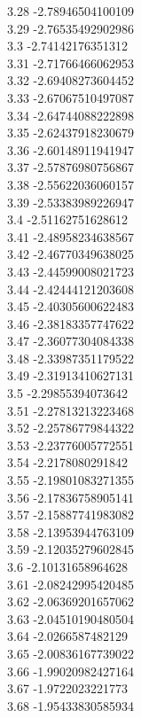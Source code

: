 {3.28	-2.78946504100109\\
3.29	-2.76535492902986\\
3.3	-2.74142176351312\\
3.31	-2.71766466062953\\
3.32	-2.69408273604452\\
3.33	-2.67067510497087\\
3.34	-2.64744088222898\\
3.35	-2.62437918230679\\
3.36	-2.60148911941947\\
3.37	-2.57876980756867\\
3.38	-2.55622036060157\\
3.39	-2.53383989226947\\
3.4	-2.51162751628612\\
3.41	-2.48958234638567\\
3.42	-2.46770349638025\\
3.43	-2.44599008021723\\
3.44	-2.42444121203608\\
3.45	-2.40305600622483\\
3.46	-2.38183357747622\\
3.47	-2.36077304084338\\
3.48	-2.33987351179522\\
3.49	-2.31913410627131\\
3.5	-2.29855394073642\\
3.51	-2.27813213223468\\
3.52	-2.25786779844322\\
3.53	-2.23776005772551\\
3.54	-2.2178080291842\\
3.55	-2.19801083271355\\
3.56	-2.17836758905141\\
3.57	-2.15887741983082\\
3.58	-2.13953944763109\\
3.59	-2.12035279602845\\
3.6	-2.10131658964628\\
3.61	-2.08242995420485\\
3.62	-2.06369201657062\\
3.63	-2.04510190480504\\
3.64	-2.0266587482129\\
3.65	-2.00836167739022\\
3.66	-1.99020982427164\\
3.67	-1.9722023221773\\
3.68	-1.95433830585934\\
}
